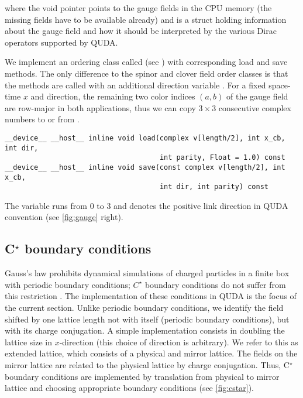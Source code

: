 where the void pointer  points to the gauge fields in the CPU memory (the missing fields have to be available already) and  is a struct holding information about the gauge field and how it should be interpreted by the various Dirac operators supported by QUDA.

We implement an ordering class called  (see  \cite{QUDApaper}) with corresponding load and save methods. The only difference to the spinor and clover field order classes is that the methods are called with an additional direction variable . For a fixed space-time $x$ and direction, the remaining two color indices $(a,b)$ of the gauge field are row-major in both applications, thus we can copy $3\times 3$ consecutive complex numbers to or from .

\begin{verbatim}
__device__ __host__ inline void load(complex v[length/2], int x_cb, int dir,
                                     int parity, Float = 1.0) const
__device__ __host__ inline void save(const complex v[length/2], int x_cb,
                                     int dir, int parity) const
\end{verbatim}

The variable  runs from $0$ to $3$ and denotes the positive link direction in QUDA convention (see \cref{fig:gauge} right).

\subsection{C$^{\star}$ boundary conditions}
\label{sub:cstar}

Gauss's law prohibits dynamical simulations of charged particles in a finite box with periodic boundary conditions; $C^\star$ boundary conditions do not suffer from this restriction \cite{Kronfeld1991}.
The implementation of these conditions in QUDA is the focus of the current section.
Unlike periodic boundary conditions, we identify the field shifted by one lattice length not with itself (periodic boundary conditions), but with
its charge conjugation. A simple implementation consists in doubling the lattice size in $x$-direction (this choice of direction is arbitrary). We refer
 to this as extended lattice, which consists of a physical and mirror lattice. The fields on the mirror lattice 
 are related to the physical lattice by charge conjugation. Thus, C$^\star$ boundary conditions are implemented by translation from
 physical to mirror lattice and choosing appropriate boundary conditions  (see \cref{fig:cstar}).


